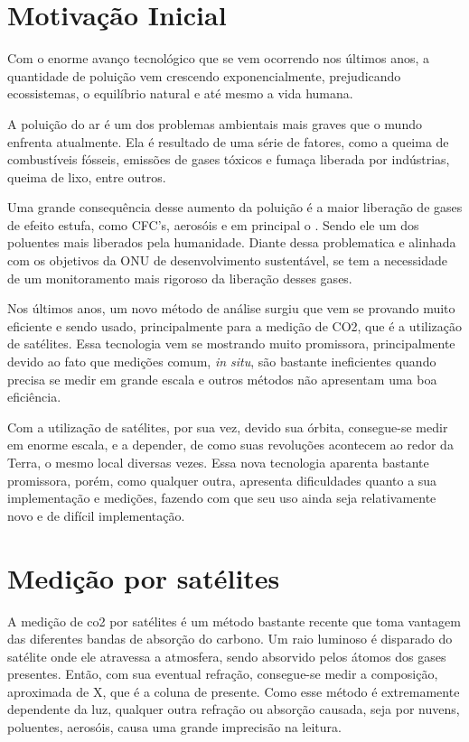 \documentclass[12pt,a4paper]{article}
\begin{document}
\section{Motivação Inicial}

Com o enorme avanço tecnológico que se vem ocorrendo nos últimos anos, a quantidade de poluição vem crescendo exponencialmente, prejudicando ecossistemas, o equilíbrio natural e até mesmo a vida humana. \par

A poluição do ar é um dos problemas ambientais mais graves que o mundo enfrenta atualmente. Ela é resultado de uma série de fatores, como a queima de combustíveis fósseis, emissões de gases tóxicos e fumaça liberada por indústrias, queima de lixo, entre outros. \par

Uma grande consequência desse aumento da poluição é a maior liberação de gases de efeito estufa, como CFC's, aerosóis e em principal o . Sendo ele um dos poluentes mais liberados pela humanidade.
Diante dessa problematica e alinhada com os objetivos da ONU de desenvolvimento sustentável, se tem a necessidade de um monitoramento mais rigoroso da liberação desses gases. \par

Nos últimos anos, um novo método de análise surgiu que vem se provando muito eficiente e sendo usado, principalmente para a medição de CO2, que é a utilização de satélites.
Essa tecnologia vem se mostrando muito promissora, principalmente devido ao fato que medições comum, \textit{in situ}, são bastante ineficientes quando precisa se medir em grande escala e outros métodos não apresentam uma boa eficiência. \par

Com a utilização de satélites, por sua vez, devido sua órbita, consegue-se medir em enorme escala, e a depender, de como suas revoluções acontecem ao redor da Terra, o mesmo local diversas vezes.
Essa nova tecnologia aparenta bastante promissora, porém, como qualquer outra, apresenta dificuldades quanto a sua implementação e medições, fazendo com que seu uso ainda seja relativamente novo e de difícil implementação.

\section{Medição por satélites}

A medição de co2 por satélites é um método bastante recente que toma vantagem das diferentes bandas de absorção do carbono. Um raio luminoso é disparado do satélite onde ele atravessa a atmosfera, sendo absorvido pelos átomos dos gases presentes. Então, com sua eventual refração, consegue-se medir a composição, aproximada de X, que é a coluna de  presente.
Como esse método é extremamente dependente da luz, qualquer outra refração ou absorção causada, seja por nuvens, poluentes, aerosóis, causa uma grande imprecisão na leitura. \par
\end{document}
